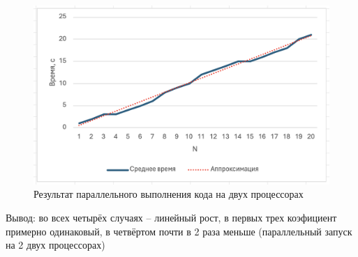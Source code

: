 \documentclass{article}
\begin{document}
\begin{figure}[H]
\centering
\includegraphics[width=1\textwidth]{images/20.png}
\caption{Результат параллельного выполнения кода на двух процессорах}
\end{figure}


Вывод: во всех четырёх случаях -- линейный рост, в первых трех коэфициент примерно одинаковый, в четвёртом почти в 2 раза меньше (параллельный запуск на 2 двух процессорах)
\end{document}
